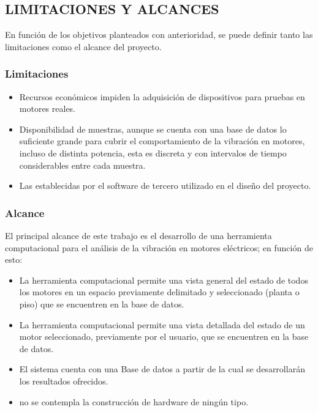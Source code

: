 
\subsection{LIMITACIONES Y ALCANCES}
	En función de los objetivos planteados con anterioridad, se puede definir tanto las limitaciones como el alcance del proyecto.

\subsubsection{Limitaciones}
\begin{itemize}
	\item Recursos económicos impiden la adquisición de dispositivos para pruebas en motores reales.

	\item Disponibilidad de muestras, aunque se cuenta con una base de datos lo suficiente grande para cubrir el comportamiento de la vibración en motores, incluso de distinta potencia, esta es discreta y con intervalos de tiempo considerables entre cada muestra.


	\item Las establecidas por el software de tercero utilizado en el diseño del proyecto.
\end{itemize}

\subsubsection{Alcance}
	El principal alcance de este trabajo es el desarrollo de una herramienta computacional para el análisis de la vibración en motores eléctricos; en función de esto:

	\begin{itemize}
		\item La herramienta computacional permite una vista general del estado de todos los motores en un espacio previamente delimitado y seleccionado (planta o piso) que se encuentren en la base de datos.

		\item La herramienta computacional permite una vista detallada del estado de un motor seleccionado, previamente por el usuario, que se encuentren en la base de datos.

		\item El sistema cuenta con una Base de datos a partir de la cual se desarrollarán los resultados ofrecidos.

		\item no se contempla la construcción de hardware de ningún tipo.


	\end{itemize}
